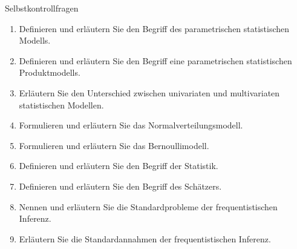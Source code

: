 \documentclass[
  8pt,
  ignorenonframetext,
]{beamer}
\providecommand{\tightlist}{%
  \setlength{\itemsep}{0pt}\setlength{\parskip}{0pt}}
\begin{document}
\begin{frame}{Selbstkontrollfragen}
\protect\hypertarget{selbstkontrollfragen}{}
\small
{}

\begin{enumerate}
\tightlist
\item
  Definieren und erläutern Sie den Begriff des parametrischen
  statistischen Modells.
\item
  Definieren und erläutern Sie den Begriff eine parametrischen
  statistischen Produktmodells.
\item
  Erläutern Sie den Unterschied zwischen univariaten und multivariaten
  statistischen Modellen.
\item
  Formulieren und erläutern Sie das Normalverteilungsmodell.
\item
  Formulieren und erläutern Sie das Bernoullimodell.
\item
  Definieren und erläutern Sie den Begriff der Statistik.
\item
  Definieren und erläutern Sie den Begriff des Schätzers.
\item
  Nennen und erläutern Sie die Standardprobleme der frequentistischen
  Inferenz.
\item
  Erläutern Sie die Standardannahmen der frequentistischen Inferenz.
\end{enumerate}
\end{frame}
\end{document}
